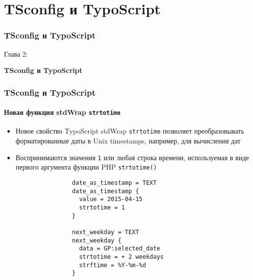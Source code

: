 %

\section{TSconfig и TypoScript}
\begin{frame}[fragile]
	\frametitle{TSconfig и TypoScript}

	\begin{center}\huge{Глава 2:}\end{center}
	\begin{center}\huge{\color{typo3darkgrey}\textbf{TSconfig и TypoScript}}\end{center}

\end{frame}

\begin{frame}[fragile]
	\frametitle{TSconfig и TypoScript}
	\framesubtitle{Новая функция stdWrap \texttt{strtotime}}

	\begin{itemize}

		\item Новое свойство TypoScript stdWrap \texttt{strtotime} позволяет преобразовывать
			форматированные даты в Unix timestamps, например, для вычисления дат

		\item Воспринимаются значения \texttt{1} или любая строка времени, используемая в виде
			первого аргумента функции PHP \texttt{strtotime()}

			\begin{lstlisting}
				date_as_timestamp = TEXT
				date_as_timestamp {
				  value = 2015-04-15
				  strtotime = 1
				}

				next_weekday = TEXT
				next_weekday {
				  data = GP:selected_date
				  strtotime = + 2 weekdays
				  strftime = %Y-%m-%d
				}
			\end{lstlisting}

	\end{itemize}

\end{frame}

